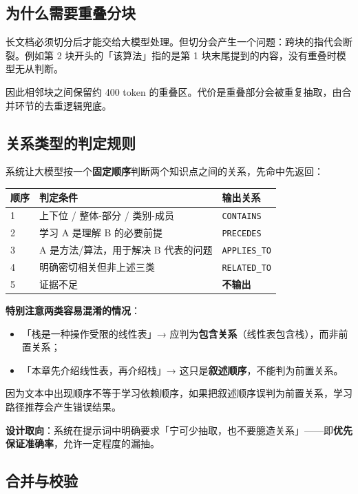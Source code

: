 \documentclass[UTF8,a4paper,11pt]{ctexrep}
\begin{document}
\subsection{为什么需要重叠分块}

长文档必须切分后才能交给大模型处理。但切分会产生一个问题：跨块的指代会断裂。例如第 2 块开头的「该算法」指的是第 1 块末尾提到的内容，没有重叠时模型无从判断。

因此相邻块之间保留约 400 token 的重叠区。代价是重叠部分会被重复抽取，由合并环节的去重逻辑兜底。


\subsection{关系类型的判定规则}

系统让大模型按一个\textbf{固定顺序}判断两个知识点之间的关系，先命中先返回：

\begin{center}
\small
\begin{tabularx}{\linewidth}{@{}XXX@{}}
\toprule
顺序 & 判定条件 & 输出关系 \\
\midrule
1 & 上下位 / 整体-部分 / 类别-成员 & \texttt{CONTAINS} \\
2 & 学习 A 是理解 B 的必要前提 & \texttt{PRECEDES} \\
3 & A 是方法/算法，用于解决 B 代表的问题 & \texttt{APPLIES\_TO} \\
4 & 明确密切相关但非上述三类 & \texttt{RELATED\_TO} \\
5 & 证据不足 & \textbf{不输出} \\
\bottomrule
\end{tabularx}
\end{center}
\textbf{特别注意两类容易混淆的情况}：

\begin{itemize}
\item 「栈是一种操作受限的线性表」→ 应判为\textbf{包含关系}（线性表包含栈），而非前置关系；
\item 「本章先介绍线性表，再介绍栈」→ 这只是\textbf{叙述顺序}，不能判为前置关系。
\end{itemize}
因为文本中出现顺序不等于学习依赖顺序，如果把叙述顺序误判为前置关系，学习路径推荐会产生错误结果。

\textbf{设计取向}：系统在提示词中明确要求「宁可少抽取，也不要臆造关系」——即\textbf{优先保证准确率}，允许一定程度的漏抽。


\subsection{合并与校验}
\end{document}
